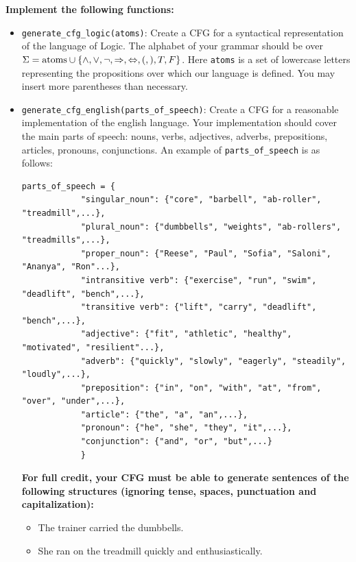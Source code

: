 \documentclass{article}
\begin{document}
\begin{tcolorbox}[enhanced,interior style={top color=Dandelion!20,bottom color=Dandelion!30}]
    \textbf{Implement the following functions:}

    \begin{itemize}
        \item \lstinline{generate_cfg_logic(atoms)}: Create a CFG for a syntactical representation of the language of Logic. The alphabet of your grammar should be over $\Sigma = \text{\lstinline{atoms}} \cup \{\land, \lor, \neg, \Rightarrow, \Leftrightarrow, (, ), T, F\}$. Here \lstinline{atoms} is a set of lowercase letters representing the propositions over which our language is defined. You may insert more parentheses than necessary.
        \item
        \lstinline{generate_cfg_english(parts_of_speech)}: Create a CFG for a reasonable implementation of the english language.
        Your implementation should cover the main parts of speech: nouns, verbs, adjectives, adverbs, prepositions, articles, pronouns, conjunctions. An example of \lstinline{parts_of_speech} is as follows:
        \begin{lstlisting}[belowskip=-10pt]
        parts_of_speech = {
            "singular_noun": {"core", "barbell", "ab-roller", "treadmill",...},
            "plural_noun": {"dumbbells", "weights", "ab-rollers", "treadmills",...},
            "proper_noun": {"Reese", "Paul", "Sofia", "Saloni", "Ananya", "Ron"...},
            "intransitive verb": {"exercise", "run", "swim", "deadlift", "bench",...},
            "transitive verb": {"lift", "carry", "deadlift", "bench",...},
            "adjective": {"fit", "athletic", "healthy", "motivated", "resilient"...},
            "adverb": {"quickly", "slowly", "eagerly", "steadily", "loudly",...},
            "preposition": {"in", "on", "with", "at", "from", "over", "under",...},
            "article": {"the", "a", "an",...},
            "pronoun": {"he", "she", "they", "it",...},
            "conjunction": {"and", "or", "but",...}
            }
            \end{lstlisting}
            \textbf{For full credit, your CFG must be able to generate sentences of the following structures (ignoring tense, spaces, punctuation and capitalization):}
            \begin{itemize}
                \item The trainer carried the dumbbells.
                \item She ran on the treadmill quickly and enthusiastically.

\end{itemize}
\end{itemize}
\end{tcolorbox}
\end{document}

